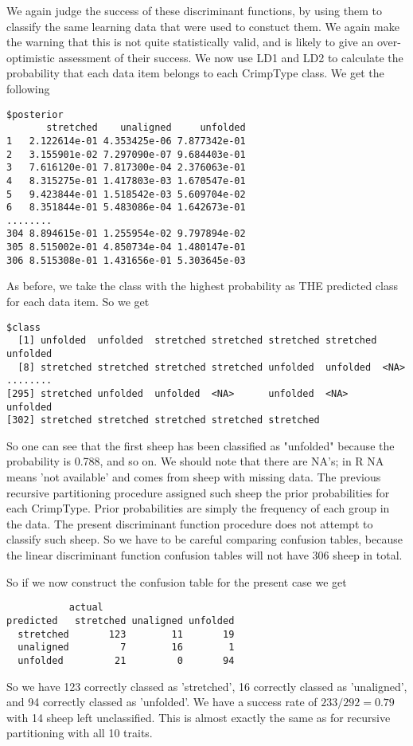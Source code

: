 \documentclass[titlepage]{article}  %
\begin{document}
We again judge the success of these discriminant functions, by using them to classify the same learning data that were used to constuct them. We again make the warning that this is not quite statistically valid, and is likely to give an over-optimistic assessment of their success. We now use LD1 and LD2 to calculate the probability that each data item belongs to each CrimpType class. We get the following
\begin{verbatim}
$posterior
       stretched    unaligned     unfolded
1   2.122614e-01 4.353425e-06 7.877342e-01
2   3.155901e-02 7.297090e-07 9.684403e-01
3   7.616120e-01 7.817300e-04 2.376063e-01
4   8.315275e-01 1.417803e-03 1.670547e-01
5   9.423844e-01 1.518542e-03 5.609704e-02
6   8.351844e-01 5.483086e-04 1.642673e-01
........
304 8.894615e-01 1.255954e-02 9.797894e-02
305 8.515002e-01 4.850734e-04 1.480147e-01
306 8.515308e-01 1.431656e-01 5.303645e-03
\end{verbatim}
As before, we take the class with the highest probability as THE predicted class for each data item. So we get
\begin{verbatim}
$class
  [1] unfolded  unfolded  stretched stretched stretched stretched unfolded 
  [8] stretched stretched stretched stretched unfolded  unfolded  <NA>     
........
[295] stretched unfolded  unfolded  <NA>      unfolded  <NA>      unfolded 
[302] stretched stretched stretched stretched stretched
\end{verbatim}
 So one can see that the first sheep has been classified as "unfolded" because the probability is 0.788, and so on. We should note that there are NA's; in R NA means 'not available' and comes from sheep with missing data. The previous recursive partitioning procedure assigned such sheep the prior probabilities for each CrimpType. Prior probabilities are simply the frequency of each group in the data. The present discriminant function procedure does not attempt to classify such sheep. So we have to be careful comparing confusion tables, because the linear discriminant function confusion tables will not have 306 sheep in total.

So if we now construct the confusion table for the present case we get
\begin{verbatim}
           actual
predicted   stretched unaligned unfolded
  stretched       123        11       19
  unaligned         7        16        1
  unfolded         21         0       94
\end{verbatim}
So we have 123 correctly classed as 'stretched', 16 correctly classed as 'unaligned', and 94 correctly classed as 'unfolded'. We have a success rate of $233/292= 0.79$ with 14 sheep left unclassified. This is almost exactly the same as for recursive partitioning with all 10 traits.
\end{document}
